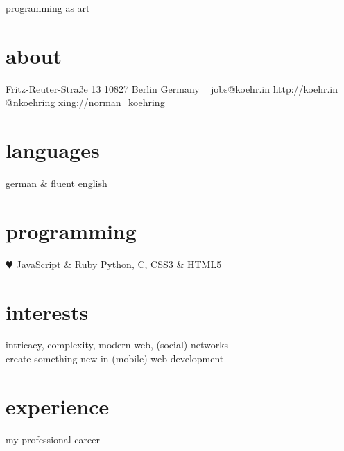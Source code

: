 \documentclass[]{friggeri-cv}
\begin{document}
       {programming as art}


\begin{aside}
  \section{about}
    Fritz-Reuter-Straße 13
    10827 Berlin
    Germany
    ~
    \href{mailto:jobs@koehr.in}{jobs@koehr.in}
    \href{http://koehr.in}{http://koehr.in}
    \href{http://twitter.com/nkoehring}{@nkoehring}
    \href{https://www.xing.com/profiles/Norman_Koehring}{xing://norman\_koehring}
  \section{languages}
    german \& fluent english
  \section{programming}
    {\color{red} $\varheartsuit$} JavaScript \& Ruby
    Python, C,
    CSS3 \& HTML5
\end{aside}

\section{interests}

intricacy, complexity, modern web, (social) networks\\
create something new in (mobile) web development

\section{experience}
my professional career
\end{document}
